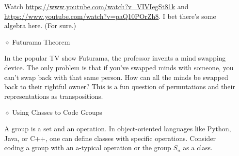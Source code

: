\documentclass[12pt]{article}
\begin{document}
\begin{itemize}
			Watch \url{https://www.youtube.com/watch?v=VIVIegSt81k} and \url{https://www.youtube.com/watch?v=paQ10POrZh8}. I bet there's some algebra here. (For sure.)
			
		\item[$\diamond$] Futurama Theorem
		
			In the popular TV show Futurama, the professor invents a mind swapping device.  The only problem is that if you've swapped minds with someone, you can't swap back with that same person.  How can all the minds be swapped back to their rightful owner?  This is a fun question of permutations and their representations as transpositions.
			
		
		\item[$\diamond$] Using Classes to Code Groups
		
			A group is a set and an operation.  In object-oriented languages like Python, Java, or C++, one can define classes with specific operations.  Consider coding a group with an a-typical operation or the group $S_n$ as a class.
	\end{itemize}
\end{document}
